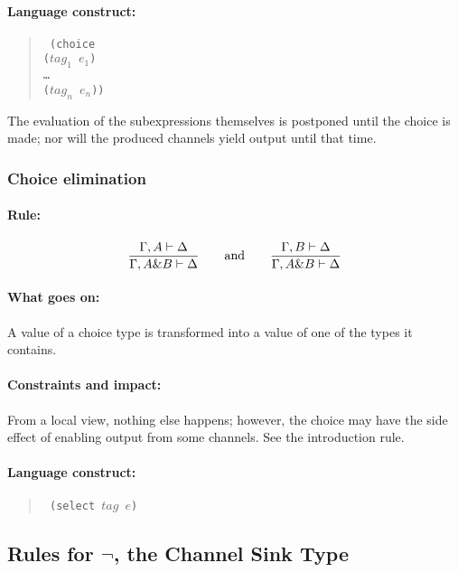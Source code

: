 \documentclass[a4paper]{article}
\begin{document}
\paragraph{Language construct:}
\begin{quote}\tt
  (choice\\
  \phantom{ }\quad ($\mathit{tag}_1$ $e_1$)\\
  \phantom{ }\quad \ldots\\
  \phantom{ }\quad ($\mathit{tag}_n$ $e_n$))
\end{quote}
The evaluation of the subexpressions themselves is postponed until the
choice is made; nor will the produced channels yield output until that time.


\subsubsection{Choice elimination}


\paragraph{Rule:}
$$
{{
  \Gamma, A \vdash \Delta
}\over{
  \Gamma, A \& B \vdash \Delta
}}
\qquad \textrm{and} \qquad
{{
  \Gamma, B \vdash \Delta
}\over{
  \Gamma, A \& B \vdash \Delta
}}
$$

\paragraph{What goes on:} A value of a choice type is transformed into
a value of one of the types it contains.

\paragraph{Constraints and impact:}
From a local view, nothing else happens;
however, the choice may have the side effect of enabling output from
some channels. See the introduction rule.

\paragraph{Language construct:}
\begin{quote}\tt
(select $\mathit{tag}$ $e$)
\end{quote}


\subsection{Rules for $\lnot$, the Channel Sink Type}
\end{document}
